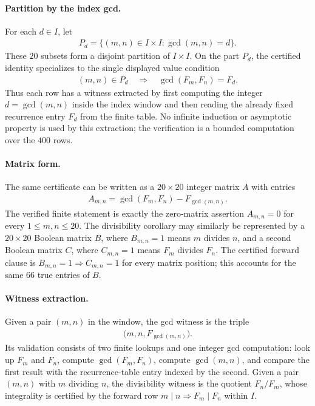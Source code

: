 \paragraph{Partition by the index gcd.}
For each $d\in I$, let
$$
\begin{aligned}
P_d=\{(m,n)\in I\times I:\gcd(m,n)=d\}.
\end{aligned}
$$
These $20$ subsets form a disjoint partition of $I\times I$.  On the part $P_d$, the certified identity specializes to the single displayed value condition
$$
\begin{aligned}
(m,n)\in P_d\quad\Longrightarrow\quad \gcd(F_m,F_n)=F_d.
\end{aligned}
$$
Thus each row has a witness extracted by first computing the integer $d=\gcd(m,n)$ inside the index window and then reading the already fixed recurrence entry $F_d$ from the finite table.  No infinite induction or asymptotic property is used by this extraction; the verification is a bounded computation over the $400$ rows.

\paragraph{Matrix form.}
The same certificate can be written as a $20\times20$ integer matrix $A$ with entries
$$
\begin{aligned}
A_{m,n}=\gcd(F_m,F_n)-F_{\gcd(m,n)}.
\end{aligned}
$$
The verified finite statement is exactly the zero-matrix assertion $A_{m,n}=0$ for every $1\leq m,n\leq20$.  The divisibility corollary may similarly be represented by a $20\times20$ Boolean matrix $B$, where $B_{m,n}=1$ means $m$ divides $n$, and a second Boolean matrix $C$, where $C_{m,n}=1$ means $F_m$ divides $F_n$.  The certified forward clause is $B_{m,n}=1\Rightarrow C_{m,n}=1$ for every matrix position; this accounts for the same $66$ true entries of $B$.

\paragraph{Witness extraction.}
Given a pair $(m,n)$ in the window, the gcd witness is the triple
$$
\begin{aligned}
\bigl(m,n,F_{\gcd(m,n)}\bigr).
\end{aligned}
$$
Its validation consists of two finite lookups and one integer gcd computation: look up $F_m$ and $F_n$, compute $\gcd(F_m,F_n)$, compute $\gcd(m,n)$, and compare the first result with the recurrence-table entry indexed by the second.  Given a pair $(m,n)$ with $m$ dividing $n$, the divisibility witness is the quotient $F_n/F_m$, whose integrality is certified by the forward row $m\mid n\Rightarrow F_m\mid F_n$ within $I$.

